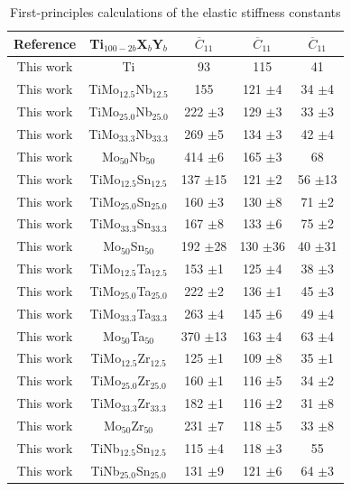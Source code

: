 \newpage
\begin{longtable}[H]{ c c c c c}
	\caption{First-principles calculations of the elastic stiffness constants} 	\label{Ch6-table:tixyecijdata} \\
	\hline
	Reference & Ti$_{100-2b}$X$_b$Y$_b$ & $\overline{C}_{11}$ & $\overline{C}_{11}$ & $\overline{C}_{11}$ \\
	\hline
	\endhead
	\hline
	\endfoot
	This work & Ti & 93 & 115 & 41 \\
	This work & TiMo$_{12.5}$Nb$_{12.5}$ & 155 & 121 $\pm$4 & 34 $\pm$4 \\
	This work & TiMo$_{25.0}$Nb$_{25.0}$ & 222 $\pm$3 & 129 $\pm$3 & 33 $\pm$3 \\
	This work & TiMo$_{33.3}$Nb$_{33.3}$ & 269 $\pm$5 & 134 $\pm$3 & 42 $\pm$4 \\
	This work & Mo$_{50}$Nb$_{50}$ & 414 $\pm$6 & 165 $\pm$3 & 68 \\
	This work & TiMo$_{12.5}$Sn$_{12.5}$ & 137 $\pm$15 & 121 $\pm$2 & 56 $\pm$13 \\
	This work & TiMo$_{25.0}$Sn$_{25.0}$ & 160 $\pm$3 & 130 $\pm$8 & 71 $\pm$2 \\
	This work & TiMo$_{33.3}$Sn$_{33.3}$ & 167 $\pm$8 & 133 $\pm$6 & 75 $\pm$2 \\
	This work & Mo$_{50}$Sn$_{50}$ & 192 $\pm$28 & 130 $\pm$36 & 40 $\pm$31 \\
	This work & TiMo$_{12.5}$Ta$_{12.5}$ & 153 $\pm$1 & 125 $\pm$4 & 38 $\pm$3 \\
	This work & TiMo$_{25.0}$Ta$_{25.0}$ & 222 $\pm$2 & 136 $\pm$1 & 45 $\pm$3 \\
	This work & TiMo$_{33.3}$Ta$_{33.3}$ & 263 $\pm$4 & 145 $\pm$6 & 49 $\pm$4 \\
	This work & Mo$_{50}$Ta$_{50}$ & 370 $\pm$13 & 163 $\pm$4 & 63 $\pm$4 \\
	This work & TiMo$_{12.5}$Zr$_{12.5}$ & 125 $\pm$1 & 109 $\pm$8 & 35 $\pm$1 \\
	This work & TiMo$_{25.0}$Zr$_{25.0}$ & 160 $\pm$1 & 116 $\pm$5 & 34 $\pm$2 \\
	This work & TiMo$_{33.3}$Zr$_{33.3}$ & 182 $\pm$1 & 116 $\pm$2 & 31 $\pm$8 \\
	This work & Mo$_{50}$Zr$_{50}$ & 231 $\pm$7 & 118 $\pm$5 & 33 $\pm$8 \\
	This work & TiNb$_{12.5}$Sn$_{12.5}$ & 115 $\pm$4 & 118 $\pm$3 & 55 \\
	This work & TiNb$_{25.0}$Sn$_{25.0}$ & 131 $\pm$9 & 121 $\pm$6 & 64 $\pm$3 \\

\end{longtable}
